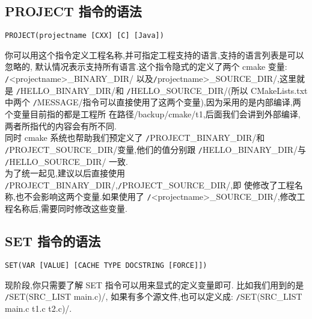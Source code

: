 \documentclass[oneside, 12pt]{book}
\begin{document}
\subsection{PROJECT 指令的语法}
\begin{verbatim}
PROJECT(projectname [CXX] [C] [Java]) 
\end{verbatim}
你可以用这个指令定义工程名称,并可指定工程支持的语言,支持的语言列表是可以忽略的, 默认情况表示支持所有语言.这个指令隐式的定义了两个 cmake 变量: 
\texttt/<projectname>_BINARY_DIR/ 以及\texttt/projectname>_SOURCE_DIR/,这里就是 \texttt/HELLO_BINARY_DIR/和 
\texttt/HELLO_SOURCE_DIR/(所以 CMakeLists.txt 中两个 \texttt/MESSAGE/指令可以直接使用了这两个变量),因为采用的是内部编译,两个变量目前指的都是工程所
在路径/backup/cmake/t1,后面我们会讲到外部编译,两者所指代的内容会有所不同.\\
同时 cmake 系统也帮助我们预定义了 \texttt/PROJECT_BINARY_DIR/和 \texttt/PROJECT_SOURCE_DIR/变量,他们的值分别跟 \texttt/HELLO_BINARY_DIR/与 \texttt/HELLO_SOURCE_DIR/ 一致.\\
为了统一起见,建议以后直接使用 \texttt/PROJECT_BINARY_DIR/,\texttt/PROJECT_SOURCE_DIR/,即 使修改了工程名称,也不会影响这两个变量.如果使用了 \texttt/<projectname>_SOURCE_DIR/,修改工程名称后,需要同时修改这些变量.
\subsection{SET 指令的语法}
\begin{verbatim}
SET(VAR [VALUE] [CACHE TYPE DOCSTRING [FORCE]]) 
\end{verbatim}
现阶段,你只需要了解 SET 指令可以用来显式的定义变量即可. 比如我们用到的是 \texttt/SET(SRC_LIST main.c)/,
如果有多个源文件,也可以定义成: \texttt/SET(SRC_LIST main.c t1.c t2.c)/.
\end{document}
